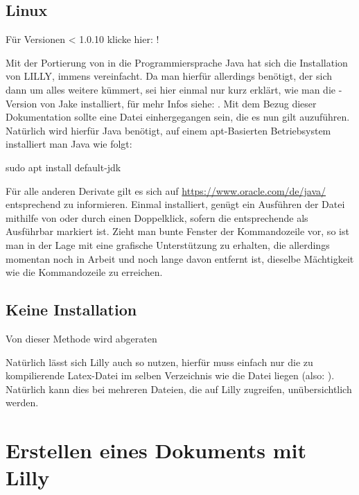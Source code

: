\subsection{Linux}
\begin{center}
    Für Versionen < 1.0.10 klicke hier: !
\end{center}
Mit der Portierung von \Jake in die Programmiersprache Java hat sich die Installation von LILLY, immens vereinfacht.
Da man hierfür allerdings \Jake benötigt, der sich dann um alles weitere kümmert, sei hier einmal nur kurz erklärt, wie man die -Version von Jake installiert, für mehr Infos siehe: .\newline
Mit dem Bezug dieser Dokumentation sollte eine  Datei einhergegangen sein, die es nun gilt auzuführen. Natürlich wird hierfür Java benötigt, auf einem apt-Basierten Betriebsystem installiert man Java wie folgt: 
\begin{bash}
sudo apt install default-jdk
\end{bash}
Für alle anderen Derivate gilt es sich auf \url{https://www.oracle.com/de/java/} entsprechend zu informieren.
Einmal installiert, genügt ein Ausführen der  Datei mithilfe von  oder durch
einen Doppelklick, sofern die entsprechende  als Ausführbar markiert ist. Zieht man bunte Fenster der Kommandozeile vor, so ist man in der Lage mit  eine grafische Unterstützung zu erhalten, die allerdings momentan noch in Arbeit und noch lange davon entfernt ist, dieselbe Mächtigkeit wie die Kommandozeile zu erreichen. 

\subsection{Keine Installation}
\begin{bemerkung}
    Von dieser Methode wird abgeraten
\end{bemerkung}
Natürlich lässt sich Lilly auch so nutzen, hierfür muss einfach nur die zu kompilierende Latex-Datei im selben Verzeichnis wie die Datei  liegen (also: ). Natürlich kann dies bei mehreren Dateien, die auf Lilly zugreifen, unübersichtlich werden.
\clearpage
\section[Erstellen eines Dokuments mit Lilly]{Erstellen eines Dokuments mit Lilly \tiny{}}
